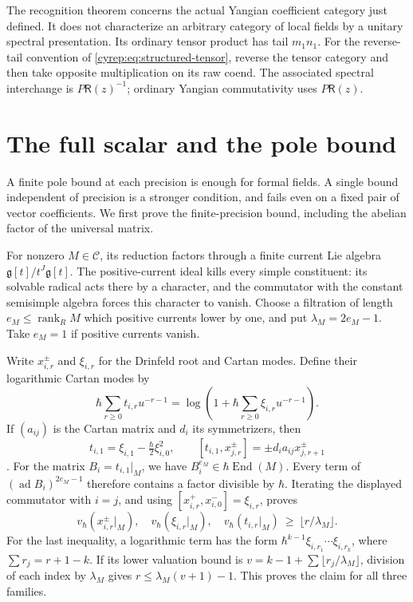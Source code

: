 The recognition theorem concerns the actual Yangian coefficient
category just defined. It does not characterize an arbitrary
category of local fields by a unitary spectral presentation.
Its ordinary tensor product has tail \(m_1n_1\).
For the reverse-tail convention of
\eqref{cyrep:eq:structured-tensor}, reverse the tensor category
and then take opposite multiplication on its raw coend.
The associated spectral interchange is \(P\mathsf R(z)^{-1}\);
ordinary Yangian commutativity uses \(P\mathsf R(z)\).

\section{The full scalar and the pole bound}
\label{cyrep:sec:coefficient-poles}

A finite pole bound at each precision is enough for formal fields.
A single bound independent of precision is a stronger condition,
and fails even on a fixed pair of vector coefficients.
We first prove the finite-precision bound, including the abelian
factor of the universal matrix.

For nonzero \(M\in\mathcal C\), its reduction factors through a
finite current Lie algebra \(\mathfrak g[t]/t^J\mathfrak g[t]\).
The positive-current ideal kills every simple constituent: its
solvable radical acts there by a character, and the commutator with
the constant semisimple algebra forces this character to vanish.
Choose a filtration of length \(e_M\leq\operatorname{rank}_R M\)
which positive currents lower by one, and put
\(\lambda_M=2e_M-1\). Take \(e_M=1\) if positive currents vanish.

Write \(x_{i,r}^{\pm}\) and \(\xi_{i,r}\) for the Drinfeld root
and Cartan modes. Define their logarithmic Cartan modes by
\[
 \hbar\sum_{r\geq0}t_{i,r}u^{-r-1}
   =\log\left(1+\hbar\sum_{r\geq0}\xi_{i,r}u^{-r-1}\right).
\]
If \((a_{ij})\) is the Cartan matrix and \(d_i\) its symmetrizers,
then
\[
 t_{i,1}=\xi_{i,1}-\tfrac\hbar2\xi_{i,0}^2,\qquad
 [t_{i,1},x_{j,r}^{\pm}]=\pm d_i a_{ij}x_{j,r+1}^{\pm}
\]
\cite[\S2.4]{GautamToledanoLaredoWendlandt2021}.
For the matrix \(B_i=t_{i,1}|_M\), we have
\(B_i^{e_M}\in\hbar\operatorname{End}(M)\).
Every term of \((\operatorname{ad}B_i)^{2e_M-1}\) therefore
contains a factor divisible by \(\hbar\).
Iterating the displayed commutator with \(i=j\), and using
\([x_{i,r}^+,x_{i,0}^-]=\xi_{i,r}\), proves
\begin{equation}\label{cyrep:eq:mode-bound}
 v_\hbar(x_{i,r}^{\pm}|_M),\quad
 v_\hbar(\xi_{i,r}|_M),\quad v_\hbar(t_{i,r}|_M)
                 \ \geq\ \lfloor r/\lambda_M\rfloor.
\end{equation}
For the last inequality, a logarithmic term has the form
\(\hbar^{k-1}\xi_{i,r_1}\cdots\xi_{i,r_k}\), where
\(\sum r_j=r+1-k\). If its lower valuation bound is
\(v=k-1+\sum\lfloor r_j/\lambda_M\rfloor\), division of each
index by \(\lambda_M\) gives \(r\leq\lambda_M(v+1)-1\).
This proves the claim for all three families.

